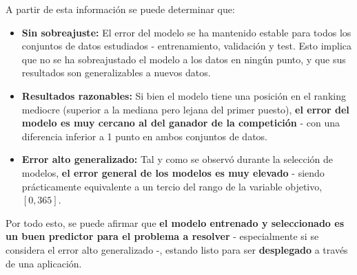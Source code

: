 A partir de esta información se puede determinar que:
\begin{itemize}[parsep=1pt, itemsep=2pt, topsep=4pt]
	\item \textbf{Sin sobreajuste:} El error del modelo se ha mantenido estable para todos los conjuntos de datos estudiados - entrenamiento, validación y test. Esto implica que no se ha sobreajustado el modelo a los datos en ningún punto, y que sus resultados son generalizables a nuevos datos.
	\item \textbf{Resultados razonables:} Si bien el modelo tiene una posición en el ranking mediocre (superior a la mediana pero lejana del primer puesto), \textbf{el error del modelo es muy cercano al del ganador de la competición} - con una diferencia inferior a 1 punto en ambos conjuntos de datos.
	\item \textbf{Error alto generalizado:} Tal y como se observó durante la selección de modelos, \textbf{el error general de los modelos es muy elevado} - siendo prácticamente equivalente a un tercio del rango de la variable objetivo, $[0,365]$.
\end{itemize}

Por todo esto, se puede afirmar que \textbf{el modelo entrenado y seleccionado es un buen predictor para el problema a resolver} - especialmente si se considera el error alto generalizado -, estando listo para ser \textbf{desplegado} a través de una aplicación.